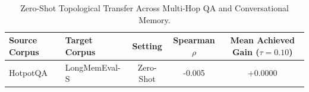 \begin{table}[t]
\centering
\small
\caption{Zero-Shot Topological Transfer Across Multi-Hop QA and Conversational Memory.}
\label{tab:zero_shot_transfer}
\begin{tabular}{llccc}
\toprule
\textbf{Source Corpus} & \textbf{Target Corpus} & \textbf{Setting} & \textbf{Spearman $\rho$} & \textbf{Mean Achieved Gain ($\tau=0.10$)} \\
\midrule
HotpotQA & LongMemEval-S & Zero-Shot & -0.005 & +0.0000 \\
\bottomrule
\end{tabular}
\end{table}